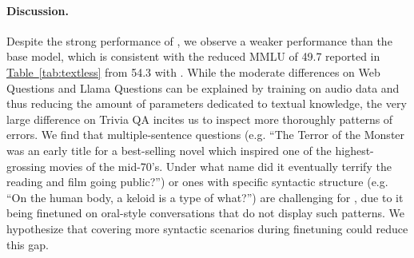 \paragraph{Discussion.} Despite the strong performance of \ours{}, we observe a weaker performance than the base\helium{} model, which is consistent with the reduced MMLU of 49.7 reported in \hyperref[tab:textless]{Table~\ref{tab:textless}} from 54.3 with \helium{}. While the moderate differences on Web Questions and Llama Questions can be explained by training on audio data and thus reducing the amount of parameters dedicated to textual knowledge, the very large difference on Trivia QA incites us to inspect more thoroughly patterns of errors. We find that multiple-sentence questions (e.g. ``The Terror of the Monster was an early title for a best-selling novel which inspired one of the highest-grossing movies of the mid-70's. Under what name did it eventually terrify the reading and film going public?'') or ones with specific syntactic structure (e.g. ``On the human body, a keloid is a type of what?'') are challenging for \ours{}, due to it being finetuned on oral-style conversations that do not display such patterns. We hypothesize that covering more syntactic scenarios during finetuning could reduce this gap.

\begin{table}[t]
    \footnotesize	
    \centering
    \caption{\textbf{Linguistic quality and turn-taking statistics of generated dialogues}. As we train our multi-stream model to generate both sides of the conversation, we can generate dialogues without the need to interact with a real user. This allows evaluating how much \ours{} learns natural conversational dynamics.}
    \label{tab:multistream}
\end{table}

